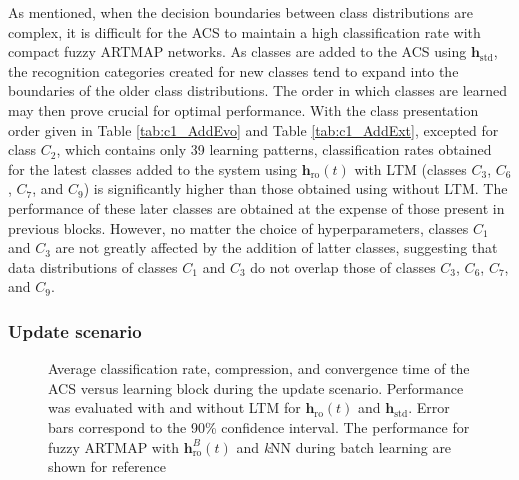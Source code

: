 As mentioned, when the decision boundaries between class distributions are complex, it is difficult for the ACS to maintain a high classification rate with compact fuzzy ARTMAP networks. As classes are added to the ACS using $\textbf{h}_\text{std}$, the recognition categories created for new classes tend to expand into the boundaries of the older class distributions. The order in which classes are learned may then prove crucial for optimal performance. With the class presentation order given in Table \ref{tab:c1_AddEvo} and Table \ref{tab:c1_AddExt}, excepted for class $C_2$, which contains only 39 learning patterns, classification rates obtained for the latest classes added to the system using $\textbf{h}_\text{ro}(t)$ with LTM (classes $C_3$, $C_6$, $C_7$, and $C_9$) is significantly higher than those obtained using without LTM. The performance of these later classes are obtained at the expense of those present in previous blocks. However, no matter the choice of hyperparameters, classes $C_1$ and $C_3$ are not greatly affected by the addition of latter classes, suggesting that data distributions of classes $C_1$ and $C_3$ do not overlap those of classes $C_3$, $C_6$, $C_7$, and $C_9$.

\subsubsection{Update scenario}

\begin{figure*}[!t]
  \centering
 	\caption{Average classification rate, compression, and convergence time of the ACS versus learning block during the update scenario. Performance was evaluated with and without LTM for $\textbf{h}_\text{ro}(t)$ and $\textbf{h}_\text{std}$. Error bars correspond to the 90\% confidence interval. The performance for fuzzy ARTMAP with $\textbf{h}_\text{ro}^B(t)$ and \textit{k}NN during batch learning are shown for reference}
	\label{fig:c1_RefExt}
\end{figure*}

